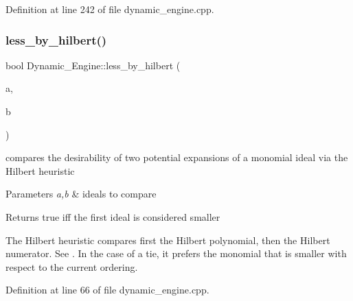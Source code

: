 Definition at line 242 of file dynamic\+\_\+engine.\+cpp.

\mbox{\label{namespace_dynamic___engine_acb9d5de295d3d96abfa40dd47ae41c1f}} 
\subsubsection{\texorpdfstring{less\+\_\+by\+\_\+hilbert()}{less\_by\_hilbert()}}
{\footnotesize\ttfamily bool Dynamic\+\_\+\+Engine\+::less\+\_\+by\+\_\+hilbert (\begin{DoxyParamCaption}\item[{\hyperlink{group___g_b_computation_class_dynamic___engine_1_1_p_p___with___ideal}{P\+P\+\_\+\+With\+\_\+\+Ideal} \&}]{a,  }\item[{\hyperlink{group___g_b_computation_class_dynamic___engine_1_1_p_p___with___ideal}{P\+P\+\_\+\+With\+\_\+\+Ideal} \&}]{b }\end{DoxyParamCaption})}



compares the desirability of two potential expansions of a monomial ideal via the Hilbert heuristic 


\begin{DoxyParams}{Parameters}
{\em a,b} & ideals to compare \\
\hline
\end{DoxyParams}
\begin{DoxyReturn}{Returns}
{\ttfamily true} iff the first ideal is considered smaller
\end{DoxyReturn}
The Hilbert heuristic compares first the Hilbert polynomial, then the Hilbert numerator. See \cite{CaboaraDynAlg}. In the case of a tie, it prefers the monomial that is smaller with respect to the current ordering. 

Definition at line 66 of file dynamic\+\_\+engine.\+cpp.

\mbox{\label{namespace_dynamic___engine_afe48703afece2137e511824b00ccad39}} 
